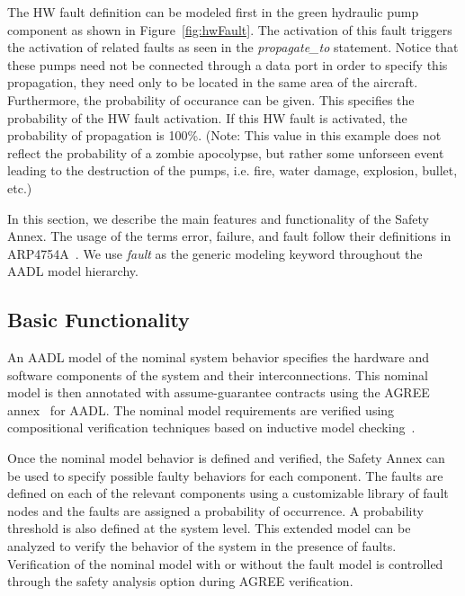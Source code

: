 The HW fault definition can be modeled first in the green hydraulic pump component as shown in Figure~\ref{fig:hwFault}. The activation of this fault triggers the activation of related faults as seen in the \textit{propagate\_to} statement. Notice that these pumps need not be connected through a data port in order to specify this propagation, they need only to be located in the same area of the aircraft. Furthermore, the probability of occurance can be given. This specifies the probability of the HW fault activation. If this HW fault is activated, the probability of propagation is 100\%. (Note: This value in this example does not reflect the probability of a zombie apocolypse, but rather some unforseen event leading to the destruction of the pumps, i.e. fire, water damage, explosion, bullet, etc.)  




















\iffalse




In this section, we describe the main features and functionality of the Safety Annex. The usage of the terms error, failure, and fault follow their definitions in ARP4754A~\cite{SAE:ARP4754A}. We use {\em fault} as the generic modeling keyword throughout the AADL model hierarchy.

\subsection{Basic Functionality}

An AADL model of the nominal system behavior specifies the hardware and software components of the system and their interconnections. This nominal model is then annotated with assume-guarantee contracts using the AGREE annex~\cite{NFM2012:CoGaMiWhLaLu} for AADL. The nominal model requirements are verified using compositional verification techniques based on inductive model checking~\cite{2017arXiv171201222G}.

Once the nominal model behavior is defined and verified, the Safety Annex can be used to specify possible faulty behaviors for each component. The faults are defined on each of the relevant components using a customizable library of fault nodes and the faults are assigned a probability of occurrence. A probability threshold is also defined at the system level. This extended model can be analyzed to verify the behavior of the system in the presence of faults. Verification of the nominal model with or without the fault model is controlled through the safety analysis option during AGREE verification.

